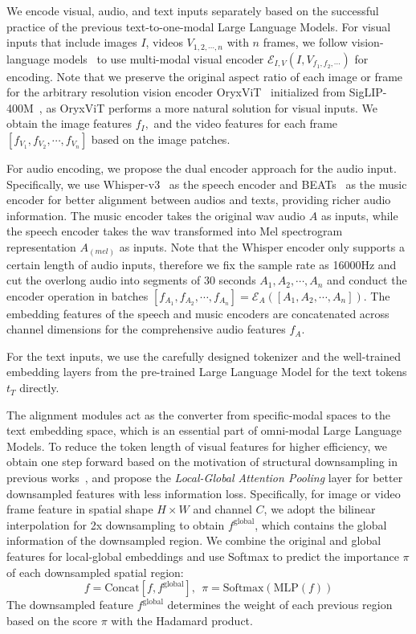 We encode visual, audio, and text inputs separately based on the successful practice of the previous text-to-one-modal Large Language Models. For visual inputs that include images $I$, videos $V_{1, 2, \cdots, n}$ with $n$ frames, we follow vision-language models~\citep{liu2024llava,li2023blip2} to use multi-modal visual encoder $\mathcal{E}_{I,V}(I, V_{f_1, f_2, \cdots})$ for encoding. Note that we preserve the original aspect ratio of each image or frame for the arbitrary resolution vision encoder OryxViT~\citep{liu2024oryx} initialized from SigLIP-400M~\citep{zhai2023siglip}, as OryxViT performs a more natural solution for visual inputs. We obtain the image features $f_{I},$ and the video features for each frame $[f_{V_{1}},f_{V_{2}}, \cdots, f_{V_{n}}]$ based on the image patches. 

For audio encoding, we propose the dual encoder approach for the audio input. Specifically, we use Whisper-v3~\citep{radford2022whisper} as the speech encoder and BEATs~\citep{Chen2022beats} as the music encoder for better alignment between audios and texts, providing richer audio information. The music encoder takes the original wav audio $A$ as inputs, while the speech encoder takes the wav transformed into Mel spectrogram representation $A_{(mel)}$ as inputs. Note that the Whisper encoder only supports a certain length of audio inputs, therefore we fix the sample rate as 16000Hz and cut the overlong audio into segments of 30 seconds $A_1, A_2, \cdots, A_n$ and conduct the encoder operation in batches $[f_{A_1},f_{A_2},\cdots,f_{A_n}]=\mathcal{E}_A([A_1, A_2, \cdots, A_n])$. The embedding features of the speech and music encoders are concatenated across channel dimensions for the comprehensive audio features $f_A$. 

For the text inputs, we use the carefully designed tokenizer and the well-trained embedding layers from the pre-trained Large Language Model for the text tokens $t_T$ directly.

The alignment modules act as the converter from specific-modal spaces to the text embedding space, which is an essential part of omni-modal Large Language Models. To reduce the token length of visual features for higher efficiency, we obtain one step forward based on the motivation of structural downsampling in previous works~\citep{li2024minigemini}, and propose the \textit{Local-Global Attention Pooling} layer for better downsampled features with less information loss. Specifically, for image or video frame feature in spatial shape $H\times W$ and channel $C$, we adopt the bilinear interpolation for 2x downsampling to obtain $f^{\text{global}}$, which contains the global information of the downsampled region. We combine the original and global features for local-global embeddings and use Softmax to predict the importance $\pi$ of each downsampled spatial region:
\begin{equation}
    f=\text{Concat}[f,f^{\text{global}}], \ \ \pi=\text{Softmax}(\text{MLP}(f))
\end{equation}
The downsampled feature $f^{\text{global}}$ determines the weight of each previous region based on the score $\pi$ with the Hadamard product.

